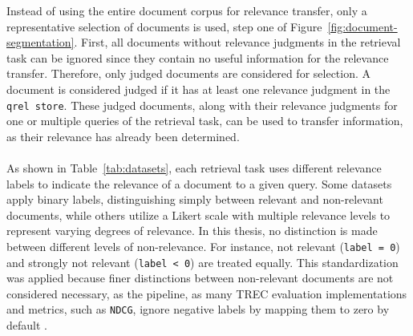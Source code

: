Instead of using the entire document corpus for relevance transfer, only a representative selection of documents is used, step one of Figure~\ref{fig:document-segmentation}. First, all documents without relevance judgments in the retrieval task can be ignored since they contain no useful information for the relevance transfer. Therefore, only judged documents are considered for selection. A document is considered judged if it has at least one relevance judgment in the \texttt{qrel store}. These judged documents, along with their relevance judgments for one or multiple queries of the retrieval task, can be used to transfer information, as their relevance has already been determined.
\\\\
As shown in Table~\ref{tab:datasets}, each retrieval task uses different relevance labels to indicate the relevance of a document to a given query. Some datasets apply binary labels, distinguishing simply between relevant and non-relevant documents, while others utilize a Likert scale with multiple relevance levels to represent varying degrees of relevance. In this thesis, no distinction is made between different levels of non-relevance. For instance, \glqq not relevant\grqq{} \mbox{(\texttt{label = 0})} and \glqq strongly not relevant\grqq{} (\texttt{label < 0}) are treated equally. This standardization was applied because finer distinctions between non-relevant documents are not considered necessary, as the pipeline, as many TREC evaluation implementations and metrics, such as \texttt{NDCG}, ignore negative labels by mapping them to zero by default \citep{gienapp:2020}.
